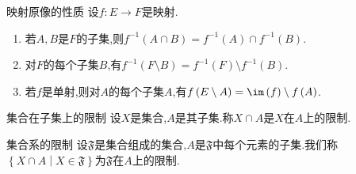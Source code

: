 \begin{proposition}{映射原像的性质}{}
	设$f:E\to F$是映射.
	\begin{enumerate}
		\item 若$A,B$是$F$的子集,则$f^{-1}\left(A\cap B\right)=f^{-1}\left(A\right)\cap f^{-1}\left(B\right)$.
		\item 对$F$的每个子集$B$,有$f^{-1}\left(F\setminus B\right)=f^{-1}\left(F\right)\setminus f^{-1}\left(B\right)$.
		\item 若$f$是单射,则对$A$的每个子集$A$,有$f\left(E\setminus A\right)=\im\left(f\right)\setminus f\left(A\right)$.
	\end{enumerate}
\end{proposition}

\begin{definition}{集合在子集上的限制}{}
	设$X$是集合,$A$是其子集.称$X\cap A$是$X$在$A$上的限制.
\end{definition}

\begin{definition}{集合系的限制}{}
	设$\mathfrak{F}$是集合组成的集合,$A$是$\mathfrak{F}$中每个元素的子集.我们称$\left\{X\cap A\middle|X\in\mathfrak{F}\right\}$为$\mathfrak{F}$在$A$上的限制.
\end{definition}

